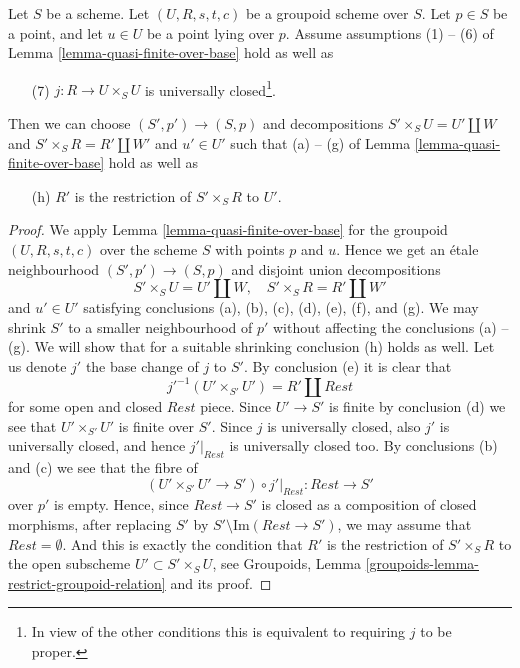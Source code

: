 \begin{lemma}
\label{lemma-quasi-finite-over-base-j-proper}
Let $S$ be a scheme.
Let $(U, R, s, t, c)$ be a groupoid scheme over $S$.
Let $p \in S$ be a point, and let $u \in U$ be a point lying over $p$.
Assume assumptions (1) -- (6) of
Lemma \ref{lemma-quasi-finite-over-base}
hold as well as
\begin{enumerate}
\item[(7)] $j : R \to U \times_S U$ is universally closed\footnote{In view of
the other conditions this is equivalent to requiring $j$ to be proper.}.
\end{enumerate}
Then we can choose $(S', p') \to (S, p)$ and decompositions
$S' \times_S U = U' \amalg W$ and $S' \times_S R = R' \amalg W'$
and $u' \in U'$ such that (a) -- (g) of
Lemma \ref{lemma-quasi-finite-over-base}
hold as well as
\begin{enumerate}
\item[(h)] $R'$ is the restriction of $S' \times_S R$ to $U'$.
\end{enumerate}
\end{lemma}

\begin{proof}
We apply Lemma \ref{lemma-quasi-finite-over-base} for the
groupoid $(U, R, s, t, c)$ over the scheme $S$ with points $p$ and $u$.
Hence we get an \'etale neighbourhood
$(S', p') \to (S, p)$ and disjoint union decompositions
$$
S' \times_S U = U' \amalg W, \quad
S' \times_S R = R' \amalg W'
$$
and $u' \in U'$ satisfying conclusions (a), (b), (c), (d), (e), (f), and (g).
We may shrink $S'$ to a smaller neighbourhood of $p'$ without
affecting the conclusions (a) -- (g). We will show that for a suitable
shrinking conclusion (h) holds as well.
Let us denote $j'$ the base change of $j$ to $S'$.
By conclusion (e) it is clear that
$$
j'^{-1}(U' \times_{S'} U') = R' \amalg Rest
$$
for some open and closed $Rest$ piece. Since $U' \to S'$ is finite
by conclusion (d) we see that $U' \times_{S'} U'$ is finite over $S'$.
Since $j$ is universally closed, also $j'$ is universally closed, and
hence $j'|_{Rest}$ is universally closed too. By conclusions
(b) and (c) we see that the fibre of
$$
(U' \times_{S'} U' \to S') \circ j'|_{Rest} :
Rest
\longrightarrow
S'
$$
over $p'$ is empty. Hence, since $Rest \to S'$ is closed as a composition
of closed morphisms, after replacing $S'$ by
$S' \setminus \text{Im}(Rest \to S')$, we may assume that
$Rest = \emptyset$. And this is exactly the condition that $R'$ is
the restriction of $S' \times_S R$ to the open subscheme
$U' \subset S' \times_S U$, see
Groupoids, Lemma \ref{groupoids-lemma-restrict-groupoid-relation}
and its proof.
\end{proof}































